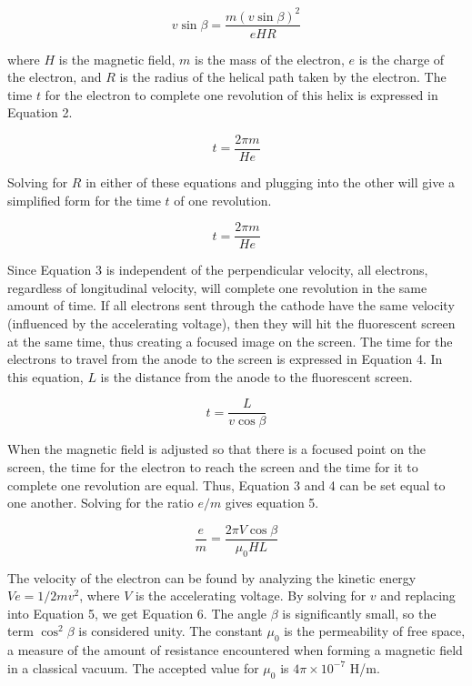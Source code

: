 \documentclass[%
 aip,
 amsmath,amssymb,
 reprint,%
floatfix,
]{revtex4-1}
\begin{document}
\begin{equation}
	v \sin{\beta} = \frac{m(v \sin{\beta})^2}{eHR}
\end{equation}
 
\noindent where $H$ is the magnetic field, $m$ is the mass of the electron, $e$ is the charge of the electron, and $R$ is the radius of the helical path taken by the electron. The time $t$ for the electron to complete one revolution of this helix is expressed in Equation 2.

\begin{equation}
	t = \frac{2 \pi m}{H e}
\end{equation}

\noindent Solving for $R$ in either of these equations and plugging into the other will give a simplified form for the time $t$ of one revolution.

\begin{equation}
	t = \frac{2 \pi m}{H e}
\end{equation}

\noindent Since Equation 3 is independent of the perpendicular velocity, all electrons, regardless of longitudinal velocity, will complete one revolution in the same amount of time. If all electrons sent through the cathode have the same velocity (influenced by the accelerating voltage), then they will hit the fluorescent screen at the same time, thus creating a focused image on the screen. The time for the electrons to travel from the anode to the screen is expressed in Equation 4. In this equation, $L$ is the distance from the anode to the fluorescent screen.

\begin{equation}
	t = \frac{L}{v \cos{\beta}}
\end{equation}

\noindent When the magnetic field is adjusted so that there is a focused point on the screen, the time for the electron to reach the screen and the time for it to complete one revolution are equal. Thus, Equation 3 and 4 can be set equal to one another. Solving for the ratio $e/m$ gives equation 5. 

\begin{equation}
	\frac{e}{m} = \frac{2 \pi V \cos{\beta}}{\mu_0 H L}
\end{equation}

\noindent The velocity of the electron can be found by analyzing the kinetic energy $V e = 1/2 m v^2$, where $V$ is the accelerating voltage. By solving for $v$ and replacing into Equation 5, we get Equation 6. The angle $\beta$ is significantly small, so the term $\cos^2{\beta}$ is considered unity. The constant $\mu_0$ is the permeability of free space, a measure of the amount of resistance encountered when forming a magnetic field in a classical vacuum. The accepted value for $\mu_0$ is $4 \pi \times 10^{-7}$ H/m.
\end{document}

